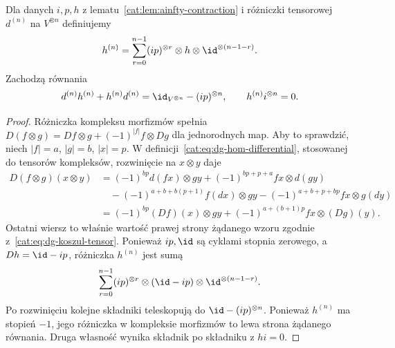 \begin{lemat}\label{cat:lem:ainfty-tensor-contraction}
Dla danych $i,p,h$ z lematu~\ref{cat:lem:ainfty-contraction} i różniczki tensorowej $d^{(n)}$ na $V^{\otimes n}$ definiujemy
\[
 h^{(n)}=\sum_{r=0}^{n-1}
 (ip)^{\otimes r}\otimes h\otimes\id^{\otimes(n-1-r)}.
\]
Zachodzą równania
\[
 d^{(n)}h^{(n)}+h^{(n)}d^{(n)}
 =\id_{V^{\otimes n}}-(ip)^{\otimes n},\qquad
 h^{(n)}i^{\otimes n}=0.
\]
\end{lemat}
\begin{proof}
Różniczka kompleksu morfizmów spełnia
$D(f\otimes g)=Df\otimes g+(-1)^{|f|}f\otimes Dg$ dla jednorodnych map. Aby to sprawdzić, niech $|f|=a$, $|g|=b$, $|x|=p$. W definicji~\eqref{cat:eq:dg-hom-differential}, stosowanej do tensorów kompleksów, rozwinięcie na $x\otimes y$ daje
\[
\begin{aligned}
 D(f\otimes g)(x\otimes y)
 &=(-1)^{bp}d(fx)\otimes gy
   +(-1)^{bp+p+a}fx\otimes d(gy)\\
 &\quad-(-1)^{a+b+b(p+1)}f(dx)\otimes gy
   -(-1)^{a+b+p+bp}fx\otimes g(dy)\\
 &=(-1)^{bp}(Df)(x)\otimes gy
   +(-1)^{a+(b+1)p}fx\otimes(Dg)(y).
\end{aligned}
\]
Ostatni wiersz to właśnie wartość prawej strony żądanego wzoru zgodnie z~\eqref{cat:eq:dg-koszul-tensor}. Ponieważ $ip,\id$ są cyklami stopnia zerowego, a $Dh=\id-ip$, różniczka $h^{(n)}$ jest sumą
\[
 \sum_{r=0}^{n-1}(ip)^{\otimes r}\otimes
 (\id-ip)\otimes\id^{\otimes(n-1-r)}.
\]
Po rozwinięciu kolejne składniki teleskopują do $\id-(ip)^{\otimes n}$. Ponieważ $h^{(n)}$ ma stopień $-1$, jego różniczka w kompleksie morfizmów to lewa strona żądanego równania. Druga własność wynika składnik po składniku z $hi=0$.
\end{proof}

